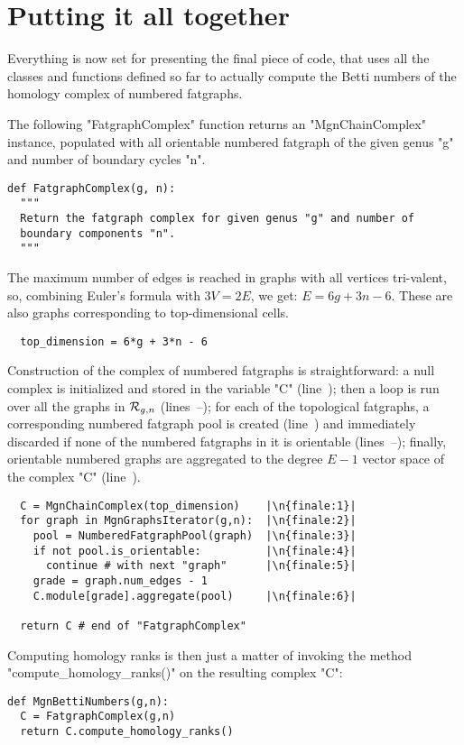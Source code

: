 \section{Putting it all together}
\label{sec:algorithm-finale}

Everything is now set for presenting the final piece of code, that
uses all the classes and functions defined so far to actually compute
the Betti numbers of the homology complex of numbered fatgraphs.

The following "FatgraphComplex" function returns an "MgnChainComplex"
instance, populated with all orientable numbered fatgraph of the given
genus "g" and number of boundary cycles "n".  
\begin{lstlisting}
def FatgraphComplex(g, n):
  """
  Return the fatgraph complex for given genus "g" and number of
  boundary components "n".
  """
\end{lstlisting}
The maximum number of edges is reached in graphs with all vertices
tri-valent, so, combining Euler's formula with $3V = 2E$, we
get: $E = 6g + 3n - 6$.  These are also graphs corresponding
to top-dimensional cells.
\begin{lstlisting}
  top_dimension = 6*g + 3*n - 6

\end{lstlisting}
Construction of the complex of numbered fatgraphs is
straightforward: a null complex is initialized and stored in the
variable "C" (line~); then a loop is run over all the
graphs in $\mathcal{R}_{g,n}$ (lines~--); for each of
the topological fatgraphs, a corresponding numbered fatgraph pool is
created (line~) and immediately discarded if none of the
numbered fatgraphs in it is orientable
(lines~--); finally, orientable numbered
graphs are aggregated to the degree $E-1$ vector space of the complex
"C" (line~).
\begin{lstlisting}
  C = MgnChainComplex(top_dimension)    |\n{finale:1}|
  for graph in MgnGraphsIterator(g,n):  |\n{finale:2}|
    pool = NumberedFatgraphPool(graph)  |\n{finale:3}|
    if not pool.is_orientable:          |\n{finale:4}|
      continue # with next "graph"      |\n{finale:5}|
    grade = graph.num_edges - 1
    C.module[grade].aggregate(pool)     |\n{finale:6}|
    
  return C # end of "FatgraphComplex"
\end{lstlisting}

Computing homology ranks is then just a matter of invoking the method
"compute_homology_ranks()" on the resulting complex "C":
\begin{lstlisting}
def MgnBettiNumbers(g,n):
  C = FatgraphComplex(g,n)
  return C.compute_homology_ranks()
\end{lstlisting}

